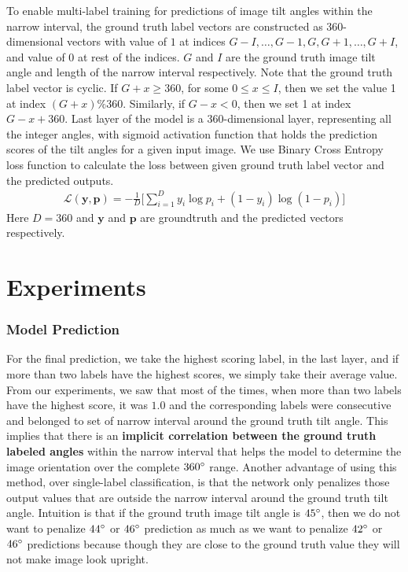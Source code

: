 \documentclass{bmvc2k}
\begin{document}
To enable multi-label training for predictions of image tilt angles within the narrow interval, the ground truth label vectors are constructed as 360-dimensional vectors with value of $1$ at indices $G-I, \dots, G-1, G, G+1, \dots, G+I$, and value of $0$ at rest of the indices. $G$ and $I$ are the ground truth image tilt angle and length of the narrow interval respectively. Note that the ground truth label vector is cyclic. If $G+x\geq 360$, for some $0\leq x\leq I$, then we set the value 1 at index $(G+x)\%360$. Similarly, if $G-x<0$, then we set 1 at index $G-x+360$. 
Last layer of the model is a 360-dimensional layer, representing all the integer angles, with sigmoid activation function that holds the prediction scores of the tilt angles for a given input image. We use Binary Cross Entropy loss function to calculate the loss between given ground truth label vector and the predicted outputs. 
\begin{align}
    \mathbf{\mathcal{L}(y, p)} = -\frac{1}{D}\Bigg[\sum_{i=1}^{D}y_{i}\log p_i + (1-y_i)\log(1-p_i)\Bigg]
\end{align}
Here $D=360$ and $\mathbf{y}$ and $\mathbf{p}$ are groundtruth and the predicted vectors respectively.


\section{Experiments}
\label{sec:experiments}
\subsubsection{Model Prediction}
For the final prediction, we take the highest scoring label, in the last layer, and if more than two labels have the highest scores, we simply take their average value. From our experiments, we saw that most of the times, when more than two labels have the highest score, it was $1.0$ and the corresponding labels were consecutive and belonged to set of narrow interval around the ground truth tilt angle. 
This implies that there is an \textbf{implicit correlation between the ground truth labeled angles} within the narrow interval that helps the model to determine the image orientation over the complete $360\degree$ range. Another advantage of using this method, over single-label classification, is that the network only penalizes those output values that are outside the  narrow interval around the ground truth tilt angle. Intuition is that if the ground truth image tilt angle is $45\degree$, then we do not want to penalize $44\degree$ or $46\degree$ prediction as much as we want to penalize $42\degree$ or $46\degree$ predictions because though they are close to the ground truth value they will not make image look upright.
\end{document}
